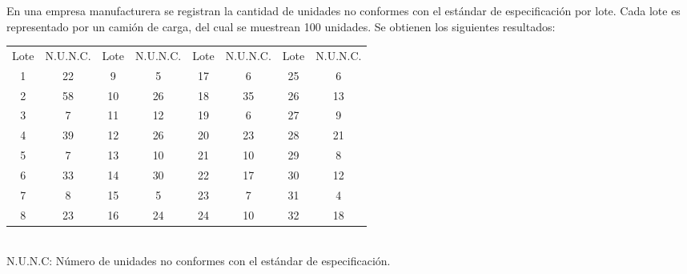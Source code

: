 
\addpoints

\question[40] En una empresa manufacturera se registran la cantidad de unidades no conformes con el estándar de especificación por lote. Cada lote es representado por un camión de carga, del cual se muestrean 100 unidades. Se obtienen los siguientes resultados:

\begin{table}[h!]
\centering
\begin{tabular}{cc|cc|cc|cc}
Lote & N.U.N.C. & Lote & N.U.N.C. & Lote & N.U.N.C. & Lote & N.U.N.C. \\
1      & 22       & 9      & 5       & 17     & 6       & 25     & 6       \\
2      & 58       & 10     & 26      & 18     & 35      & 26     & 13      \\
3      & 7        & 11     & 12      & 19     & 6       & 27     & 9       \\
4      & 39       & 12     & 26      & 20     & 23      & 28     & 21      \\
5      & 7        & 13     & 10      & 21     & 10      & 29     & 8       \\
6      & 33       & 14     & 30      & 22     & 17      & 30     & 12      \\
7      & 8        & 15     & 5       & 23     & 7       & 31     & 4       \\
8      & 23       & 16     & 24      & 24     & 10      & 32     & 18     
\end{tabular}
\\
\vspace{0.3cm}
N.U.N.C: Número de unidades no conformes con el estándar de especificación.
\end{table}

\noaddpoints


